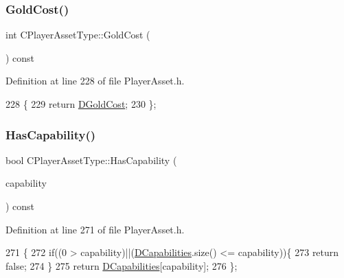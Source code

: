 \subsubsection{\texorpdfstring{Gold\+Cost()}{GoldCost()}}
{\footnotesize\ttfamily int C\+Player\+Asset\+Type\+::\+Gold\+Cost (\begin{DoxyParamCaption}{ }\end{DoxyParamCaption}) const\hspace{0.3cm}{\ttfamily [inline]}}



Definition at line 228 of file Player\+Asset.\+h.


\begin{DoxyCode}
228                             \{
229             \textcolor{keywordflow}{return} \hyperlink{classCPlayerAssetType_a2153f3ed158144fc517efd2866de0017}{DGoldCost};  
230         \};
\end{DoxyCode}
\hypertarget{classCPlayerAssetType_a0b5669f6ac23405b854a976c13f43631}{}\label{classCPlayerAssetType_a0b5669f6ac23405b854a976c13f43631} 
\subsubsection{\texorpdfstring{Has\+Capability()}{HasCapability()}}
{\footnotesize\ttfamily bool C\+Player\+Asset\+Type\+::\+Has\+Capability (\begin{DoxyParamCaption}\item[{\hyperlink{GameDataTypes_8h_a35b98ce26aca678b03c6f9f76e4778ce}{E\+Asset\+Capability\+Type}}]{capability }\end{DoxyParamCaption}) const\hspace{0.3cm}{\ttfamily [inline]}}



Definition at line 271 of file Player\+Asset.\+h.


\begin{DoxyCode}
271                                                                  \{
272             \textcolor{keywordflow}{if}((0 > capability)||(\hyperlink{classCPlayerAssetType_a243f9161c56446b378dc42b51977fc58}{DCapabilities}.size() <= capability))\{
273                 \textcolor{keywordflow}{return} \textcolor{keyword}{false};   
274             \}
275             \textcolor{keywordflow}{return} \hyperlink{classCPlayerAssetType_a243f9161c56446b378dc42b51977fc58}{DCapabilities}[capability];
276         \};
\end{DoxyCode}
\hypertarget{classCPlayerAssetType_ad82c75660f1c40d7cb0cf0d08b93e007}{}\label{classCPlayerAssetType_ad82c75660f1c40d7cb0cf0d08b93e007} 
